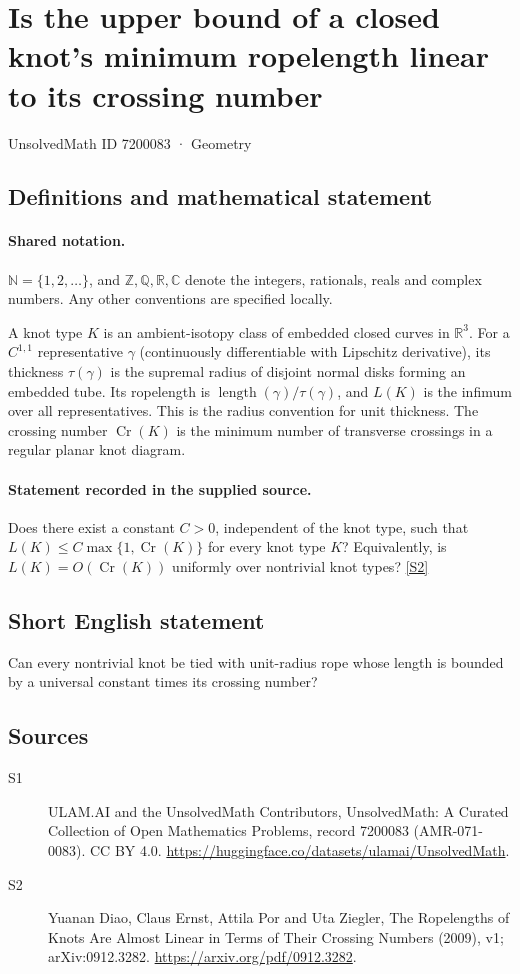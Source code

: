 \documentclass[11pt]{article}
\newcommand{\sref}[2]{\hyperlink{source:#1:#2}{[S#2]}}
\begin{document}
\setcounter{section}{7200082}
\section{Is the upper bound of a closed knot's minimum ropelength linear to its crossing number}\label{7200083}
{\small\sffamily UnsolvedMath ID 7200083 · Geometry}
\subsection{Definitions and mathematical statement}

\paragraph{Shared notation.}$\mathbb N=\{1,2,\ldots\}$, and $\mathbb Z,\mathbb Q,\mathbb R,\mathbb C$ denote the integers, rationals, reals and complex numbers. Any other conventions are specified locally.


A knot type $K$ is an ambient-isotopy class of embedded closed curves in $\mathbb R^3$. For a $C^{1,1}$ representative $\gamma$ (continuously differentiable with Lipschitz derivative), its thickness $\tau(\gamma)$ is the supremal radius of disjoint normal disks forming an embedded tube. Its ropelength is $\operatorname{length}(\gamma)/\tau(\gamma)$, and $L(K)$ is the infimum over all representatives. This is the radius convention for unit thickness. The crossing number $\operatorname{Cr}(K)$ is the minimum number of transverse crossings in a regular planar knot diagram.
\paragraph{Statement recorded in the supplied source.}
Does there exist a constant $C>0$, independent of the knot type, such that $L(K)\leq C\max\{1,\operatorname{Cr}(K)\}$ for every knot type $K$? Equivalently, is $L(K)=O(\operatorname{Cr}(K))$ uniformly over nontrivial knot types? \sref{7200083}{2}
\subsection{Short English statement}
Can every nontrivial knot be tied with unit-radius rope whose length is bounded by a universal constant times its crossing number?
\subsection{Sources}
\begin{description}
\item[\hypertarget{source:7200083:1}{S1}] ULAM.AI and the UnsolvedMath Contributors, UnsolvedMath: A Curated Collection of Open Mathematics Problems, record 7200083 (AMR-071-0083). CC BY 4.0. \url{https://huggingface.co/datasets/ulamai/UnsolvedMath}.
\item[\hypertarget{source:7200083:2}{S2}] Yuanan Diao, Claus Ernst, Attila Por and Uta Ziegler, The Ropelengths of Knots Are Almost Linear in Terms of Their Crossing Numbers (2009), v1; arXiv:0912.3282. \url{https://arxiv.org/pdf/0912.3282}.
\end{description}
\label{end:7200083}
\end{document}
